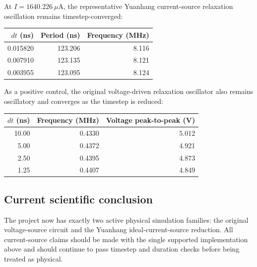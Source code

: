 \documentclass[11pt]{article}
\begin{document}
At \(I=1640.226~\mu\mathrm{A}\), the representative Yuanhang current-source relaxation oscillation remains timestep-converged:
\begin{center}
\begin{tabular}{rrr}
\toprule
\(dt\) (ns) & Period (ns) & Frequency (MHz) \\
\midrule
0.015820 & 123.206 & 8.116 \\
0.007910 & 123.135 & 8.121 \\
0.003955 & 123.095 & 8.124 \\
\bottomrule
\end{tabular}
\end{center}

As a positive control, the original voltage-driven relaxation oscillator also remains oscillatory and converges as the timestep is reduced:
\begin{center}
\begin{tabular}{rrr}
\toprule
\(dt\) (ns) & Frequency (MHz) & Voltage peak-to-peak (V) \\
\midrule
10.00 & 0.4330 & 5.012 \\
5.00 & 0.4372 & 4.921 \\
2.50 & 0.4395 & 4.873 \\
1.25 & 0.4407 & 4.849 \\
\bottomrule
\end{tabular}
\end{center}

\subsection{Current scientific conclusion}
The project now has exactly two active physical simulation families: the original voltage-source circuit and the Yuanhang ideal-current-source reduction. All current-source claims should be made with the single supported implementation above and should continue to pass timestep and duration checks before being treated as physical.
\end{document}
